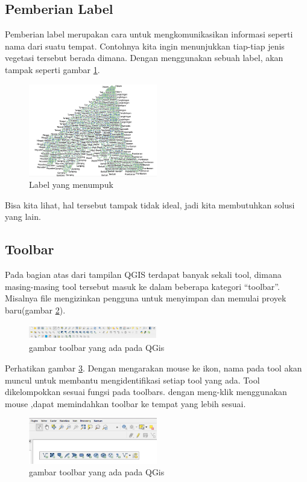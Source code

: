 \subsection{Pemberian Label}
Pemberian label merupakan cara untuk mengkomunikasikan informasi seperti nama dari suatu tempat. Contohnya kita ingin menunjukkan tiap-tiap jenis vegetasi tersebut berada dimana. Dengan menggunakan sebuah label, akan tampak seperti gambar \ref{image13}.
\begin{figure}[ht]
        \centerline{\includegraphics[width=0.5\textwidth]{figures/image13}}
        \caption{Label yang menumpuk}
        \label{image13}
        \end{figure}
Bisa kita lihat, hal tersebut tampak tidak ideal, jadi kita membutuhkan solusi yang lain. 


\subsection{Toolbar}
Pada bagian atas dari tampilan QGIS terdapat banyak sekali tool, dimana masing-masing tool tersebut masuk ke dalam beberapa kategori “toolbar”. Misalnya file mengizinkan pengguna untuk menyimpan dan memulai proyek baru(gambar \ref{toolbar}).
\begin{figure}[ht]
    \centerline{\includegraphics[width=0.5\textwidth]{figures/toolbar}}
    \caption{gambar toolbar yang ada pada QGis}
    \label{toolbar}
    \end{figure}

Perhatikan gambar \ref{toolbar1}. Dengan mengarakan mouse ke ikon, nama pada tool akan muncul untuk membantu mengidentifikasi setiap tool yang ada. Tool dikelompokkan sesuai fungsi pada toolbars. dengan meng-klik menggunakan mouse ,dapat memindahkan toolbar ke tempat yang lebih sesuai.
\begin{figure}[ht]
    \centerline{\includegraphics[width=0.5\textwidth]{figures/toolbar1}}
    \caption{gambar toolbar yang ada pada QGis}
    \label{toolbar1}
    \end{figure}
    
